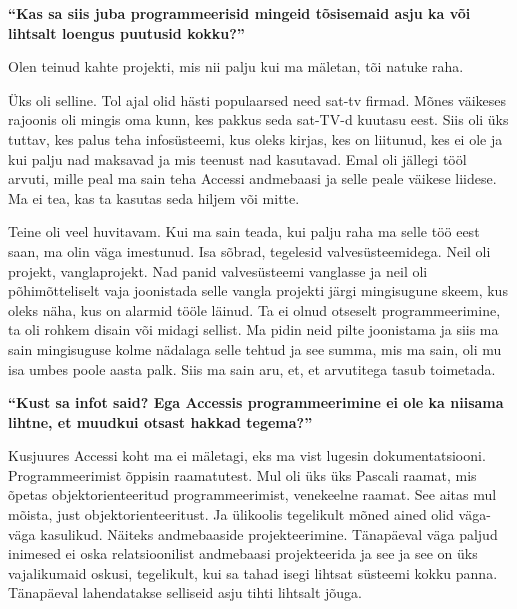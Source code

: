 \textbf{\enquote{Kas sa siis juba programmeerisid mingeid tõsisemaid asju ka 
või lihtsalt loengus puutusid kokku?}}

Olen teinud kahte projekti, mis nii palju kui ma mäletan, tõi natuke raha.

Üks oli selline. Tol ajal olid hästi populaarsed need 
sat-tv firmad. Mõnes 
väikeses rajoonis oli mingis oma kunn, kes pakkus seda sat-TV-d kuutasu eest. 
Siis oli üks tuttav, kes palus teha infosüsteemi, kus oleks kirjas, kes on 
liitunud, kes ei ole ja kui palju nad maksavad ja mis teenust nad kasutavad. 
Emal oli jällegi tööl arvuti, mille peal ma sain teha Accessi andmebaasi ja selle peale väikese liidese. Ma ei tea, kas ta kasutas 
seda hiljem või mitte.

Teine oli veel huvitavam. Kui ma sain teada, kui palju raha ma selle töö eest 
saan, ma olin väga imestunud. Isa sõbrad, tegelesid valvesüsteemidega. Neil oli 
projekt, vanglaprojekt. Nad panid valvesüsteemi vanglasse ja neil oli 
põhimõtteliselt vaja joonistada selle vangla projekti järgi mingisugune skeem, 
kus oleks näha, kus on alarmid tööle läinud. Ta ei olnud otseselt 
programmeerimine, ta oli rohkem disain või midagi sellist. Ma pidin neid pilte 
joonistama ja siis ma sain mingisuguse kolme nädalaga selle tehtud ja see 
summa, mis ma sain, oli mu isa umbes poole aasta palk. Siis ma sain aru, et, et 
arvutitega tasub toimetada.

\textbf{\enquote{Kust sa infot said? Ega Accessis programmeerimine ei ole ka 
niisama lihtne, et muudkui otsast hakkad tegema?}}

Kusjuures Accessi koht ma ei mäletagi, eks ma vist lugesin dokumentatsiooni. 
Programmeerimist õppisin 
raamatutest. Mul oli üks üks Pascali raamat, mis õpetas objektorienteeritud 
programmeerimist, venekeelne raamat. See aitas mul mõista, just 
objektorienteeritust. Ja ülikoolis tegelikult mõned ained olid väga-väga 
kasulikud. Näiteks andmebaaside projekteerimine. Tänapäeval väga paljud 
inimesed ei oska relatsioonilist andmebaasi projekteerida ja see ja see on üks 
vajalikumaid oskusi, tegelikult, kui sa tahad isegi lihtsat süsteemi kokku 
panna. Tänapäeval lahendatakse selliseid asju tihti lihtsalt jõuga.

